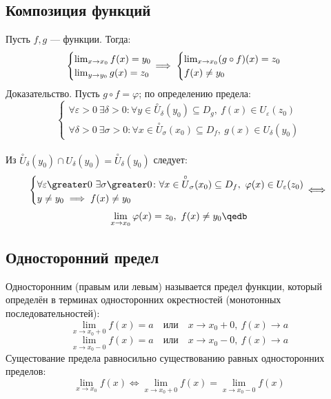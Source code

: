 \subsection{Композиция функций}

Пусть $f,g$ --- функции. Тогда:
$$\begin{cases}
\lim_{x\to x_0}f(x)=y_0\\
\lim_{y\to y_0}g(x)=z_0
\end{cases}\hspace*{-12pt}\implies\begin{cases}
\lim_{x\to x_0}(g\circ f)(x)=z_0\\
f(x)\neq y_0
\end{cases}$$
{\bold Доказательство.} Пусть $g\circ f=\varphi$; по определению предела:\\[-14pt]
$$\begin{cases}
\forall\varepsilon\greater 0\ \exists\delta\greater 0\colon\forall y\in\overset{\circ}{U}_\delta(y_0)\subseteq D_g,\ f(x)\in U_\varepsilon(z_0)\\
\forall\delta\greater 0\ \exists\sigma\greater 0\colon\forall x\in\overset{\circ}{U}_\sigma(x_0)\subseteq D_f,\ g(x)\in U_\delta(y_0)
\end{cases}$$\\[-6pt]
Из $\overset{\circ}{U}_\delta(y_0)\cap U_\delta(y_0)=\overset{\circ}{U}_\delta(y_0)$ 
следует:\\[-14pt]
$$\begin{cases}
\forall\varepsilon\greater 0\ \exists\sigma\greater 0\colon\forall x\in\overset{\circ}{U}_\sigma(x_0)\subseteq D_f,\ \varphi(x)\in U_\varepsilon(z_0)\\
y\neq y_0\implies f(x)\neq y_0
\end{cases}\hspace*{-12pt}\iff$$
$$\lim_{x\to x_0}\varphi(x)=z_0,\ f(x)\neq y_0\qedb$$

\subsection{Односторонний предел}

{\bold Односторонним} {\ital\color{desc}(правым или левым)} называется предел функции, который определён в терминах односторонних окрестностей {\ital (монотонных последовательностей)}:
$$\lim_{x\to x_0+0}f(x)=a\quad\text{или}\quad x\to x_0+0,\ f(x)\to a$$
$$\lim_{x\to x_0-0}f(x)=a\quad\text{или}\quad x\to x_0-0,\ f(x)\to a$$
Сущестование предела равносильно существованию {\ital равных} односторонних пределов:
$$\lim_{x\to x_0}f(x)\iff\lim_{x\to x_0+0}f(x)=\lim_{x\to x_0-0}f(x)$$


